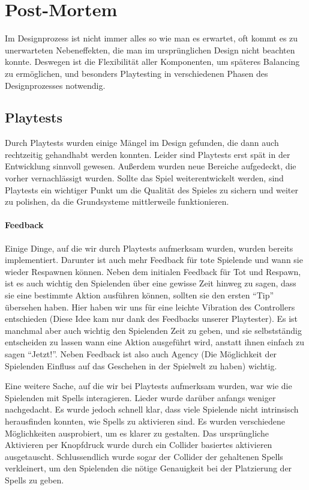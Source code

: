 \chapter{Post-Mortem}

Im Designprozess ist nicht immer alles so wie man es erwartet, oft kommt es zu unerwarteten Nebeneffekten, die man im ursprünglichen Design nicht beachten konnte. Deswegen ist die Flexibilität aller Komponenten, um späteres Balancing zu ermöglichen, und besonders Playtesting in verschiedenen Phasen des Designprozesses notwendig.

\section{Playtests}

Durch Playtests wurden einige Mängel im Design gefunden, die dann auch rechtzeitig gehandhabt werden konnten. Leider sind Playtests erst spät in der Entwicklung sinnvoll gewesen. Außerdem wurden neue Bereiche aufgedeckt, die vorher vernachlässigt wurden. Sollte das Spiel weiterentwickelt werden, sind Playtests ein wichtiger Punkt um die Qualität des Spieles zu sichern und weiter zu polishen, da die Grundsysteme mittlerweile funktionieren.

\subsubsection{Feedback}

Einige Dinge, auf die wir durch Playtests aufmerksam wurden, wurden bereits implementiert. Darunter ist auch mehr Feedback für tote Spielende und wann sie wieder Respawnen können. Neben dem initialen Feedback für Tot und Respawn, ist es auch wichtig den Spielenden über eine gewisse Zeit hinweg zu sagen, dass sie eine bestimmte Aktion ausführen können, sollten sie den ersten "`Tip"' übersehen haben. Hier haben wir uns für eine leichte Vibration des Controllers entschieden (Diese Idee kam nur dank des Feedbacks unserer Playtester). Es ist manchmal aber auch wichtig den Spielenden Zeit zu geben, und sie selbstständig entscheiden zu lassen wann eine Aktion ausgeführt wird, anstatt ihnen einfach zu sagen "`Jetzt!"'. Neben Feedback ist also auch Agency (Die Möglichkeit der Spielenden Einfluss auf das Geschehen in der Spielwelt zu haben\cite[S.98]{_game_design_workshop}) wichtig.

Eine weitere Sache, auf die wir bei Playtests aufmerksam wurden, war wie die Spielenden mit Spells interagieren. Lieder wurde darüber anfangs weniger nachgedacht. Es wurde jedoch schnell klar, dass viele Spielende nicht intrinsisch herausfinden konnten, wie Spells zu aktivieren sind. Es wurden verschiedene Möglichkeiten ausprobiert, um es klarer zu gestalten. Das ursprüngliche Aktivieren per Knopfdruck wurde durch ein Collider basiertes aktivieren ausgetauscht. Schlussendlich wurde sogar der Collider der gehaltenen Spells verkleinert, um den Spielenden die nötige Genauigkeit bei der Platzierung der Spells zu geben.

